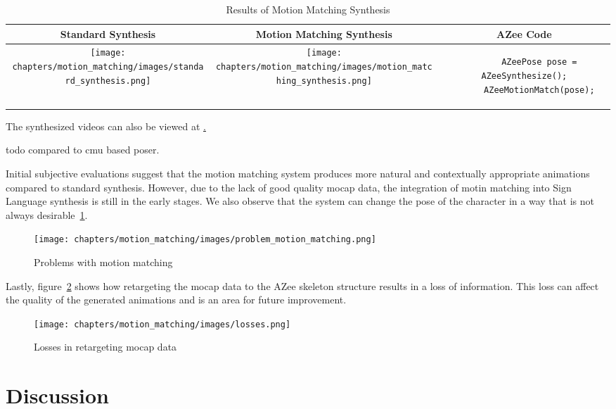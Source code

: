 \documentclass[../../main.tex]{subfiles}
\begin{document}
\begin{table}
  \centering
  \begin{tabular}{|c|c|c|}
    \hline
    \textbf{Standard Synthesis} & \textbf{Motion Matching Synthesis} & \textbf{AZee Code} \\
    \hline
    \texttt{[image: chapters/motion\_matching/images/standard\_synthesis.png]} & \texttt{[image: chapters/motion\_matching/images/motion\_matching\_synthesis.png]} & \begin{lstlisting}
      AZeePose pose = AZeeSynthesize();
      AZeeMotionMatch(pose);
    \end{lstlisting} \\
    \hline
  \end{tabular}
  \caption{Results of Motion Matching Synthesis}
  \label{tab:results}
\end{table}

The synthesized videos can also be viewed at \href{todo}.

todo compared to cmu based poser.

Initial subjective evaluations suggest that the motion matching system produces more natural and contextually appropriate animations compared to standard synthesis. However, due to the lack of good quality mocap data, the integration of motin matching into Sign Language synthesis is still in the early stages. We also observe that the system can change the pose of the character in a way that is not always desirable~\ref{fig:problem_motion_matching}.

\begin{figure}
  \centering \texttt{[image: chapters/motion\_matching/images/problem\_motion\_matching.png]}
  \caption{Problems with motion matching}
  \label{fig:problem_motion_matching}
\end{figure}

Lastly, figure~\ref{fig:losses} shows how retargeting the mocap data to the AZee skeleton structure results in a loss of information. This loss can affect the quality of the generated animations and is an area for future improvement.

\begin{figure}
  \centering \texttt{[image: chapters/motion\_matching/images/losses.png]}
  \caption{Losses in retargeting mocap data}
  \label{fig:losses}
\end{figure}

\section{Discussion}
\label{ch:motion_matching:discussion}
\end{document}
